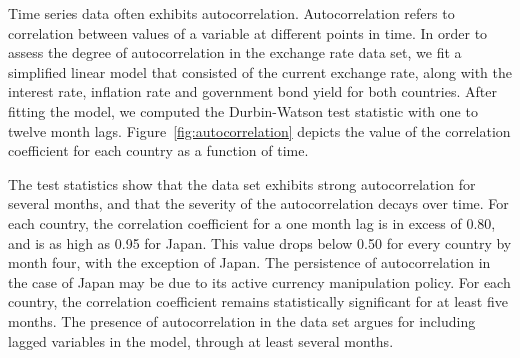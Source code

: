 \documentclass{sig-alternate-05-2015}
\begin{document}
Time series data often exhibits autocorrelation. Autocorrelation refers to correlation between values of a variable at different points in time. In order to assess the degree of autocorrelation in the exchange rate data set, we fit a simplified linear model that consisted of the current exchange rate, along with the interest rate, inflation rate and government bond yield for both countries. After fitting the model, we computed the Durbin-Watson test statistic with one to twelve month lags. Figure~\ref{fig:autocorrelation} depicts the value of the correlation coefficient for each country as a function of time.
\par{} The test statistics show that the data set exhibits strong autocorrelation for several months, and that the severity of the autocorrelation decays over time. For each country, the correlation coefficient for a one month lag is in excess of 0.80, and is as high as 0.95 for Japan. This value drops below 0.50 for every country by month four, with the exception of Japan. The persistence of autocorrelation in the case of Japan may be due to its active currency manipulation policy. For each country, the correlation coefficient remains statistically significant for at least five months. The presence of autocorrelation in the data set argues for including lagged variables in the model, through at least several months.


\end{document}
